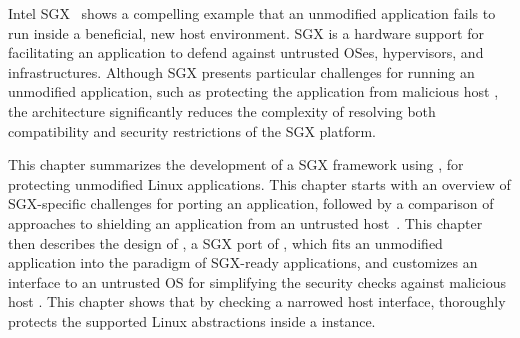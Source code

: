 Intel SGX~\cite{intelsgx} shows a compelling example that an unmodified application fails to run inside a beneficial, new host environment.
SGX is a hardware support
for facilitating an application to defend against untrusted OSes, hypervisors, and infrastructures.
Although SGX presents particular challenges for running an unmodified application, such as protecting the application
from malicious host \linuxapis{},
the \graphene{} architecture significantly reduces the complexity
of resolving both compatibility and security restrictions of the SGX platform.


This chapter summarizes the development of a SGX framework using \graphene{}, for protecting unmodified Linux applications.
This chapter starts with an overview of SGX-specific challenges
for porting an application,
followed by a comparison of approaches to shielding an application from an untrusted host~\cite{osdi16scone,shinde17panoply,baumann14haven}.
This chapter then describes the design of \graphenesgx{},
a SGX port of \graphene{},
which fits an unmodified application into the paradigm of SGX-ready applications,
and customizes an interface to an untrusted OS
for simplifying the security checks against malicious host \linuxapis{}.
This chapter shows
that by checking a narrowed host interface,
\graphene{} thoroughly protects the supported Linux abstractions inside a \thelibos{} instance.
